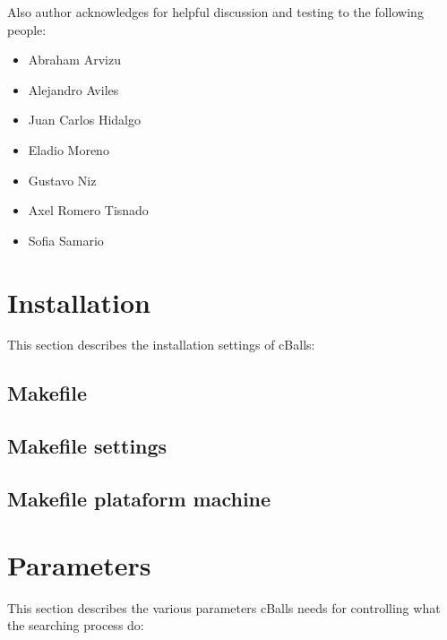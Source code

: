 \documentclass[letterpaper,10pt,english]{sphinxmanual}
\begin{document}
\sphinxAtStartPar
Also author acknowledges for helpful discussion and testing to the following people:
\begin{itemize}
\item {} 
\sphinxAtStartPar
Abraham Arvizu

\item {} 
\sphinxAtStartPar
Alejandro Aviles

\item {} 
\sphinxAtStartPar
Juan Carlos Hidalgo

\item {} 
\sphinxAtStartPar
Eladio Moreno

\item {} 
\sphinxAtStartPar
Gustavo Niz

\item {} 
\sphinxAtStartPar
Axel Romero Tisnado

\item {} 
\sphinxAtStartPar
Sofia Samario

\end{itemize}

\sphinxstepscope


\chapter{Installation}
\label{\detokenize{installation:installation}}\label{\detokenize{installation::doc}}
\sphinxAtStartPar
This section describes the installation settings of cBalls:


\section{Makefile}
\label{\detokenize{installation:makefile}}

\section{Makefile settings}
\label{\detokenize{installation:makefile-settings}}

\section{Makefile plataform machine}
\label{\detokenize{installation:makefile-plataform-machine}}
\sphinxstepscope


\chapter{Parameters}
\label{\detokenize{params:parameters}}\label{\detokenize{params::doc}}
\sphinxAtStartPar
This section describes the various parameters cBalls needs for controlling
what the searching process do:
\end{document}
